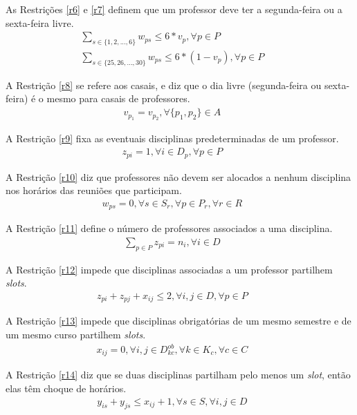 As Restrições \ref{r6} e \ref{r7} definem que um professor deve ter a segunda-feira ou a sexta-feira livre.
\begin{eqnarray}
\label{r6}
\sum_{s\in\{{1, 2, ..., 6}\}}{w_{ps}} \leq 6*v_p, \forall{p \in{P}} &&\\
\label{r7}
\sum_{s\in\{{25, 26, ..., 30}\}}{w_{ps}} \leq 6*(1-v_p), \forall{p \in{P}} &&
\end{eqnarray}

A Restrição \ref{r8} se refere aos casais, e diz que o dia livre (segunda-feira ou sexta-feira) é o mesmo para casais de professores.
\begin{eqnarray}
\label{r8}
v_{p_1} = v_{p_2}, \forall{\{p_1,p_2\} \in{A}} &&
\end{eqnarray}

A Restrição \ref{r9} fixa as eventuais disciplinas predeterminadas de um professor.
\begin{eqnarray}
\label{r9}
z_{pi} = 1, \forall{i \in{D_p}}, \forall{p \in{P}} &&
\end{eqnarray}

A Restrição \ref{r10} diz que professores não devem ser alocados a nenhum disciplina nos horários das reuniões que participam.
\begin{eqnarray}
\label{r10}
w_{ps} = 0, \forall{s \in{S_r}}, \forall{p \in{P_r}}, \forall{r \in{R}} &&
\end{eqnarray}

A Restrição \ref{r11} define o número de professores associados a uma disciplina.
\begin{eqnarray}
\label{r11}
\sum_{p\in{P}}^{}{z_{pi}} = n_i, \forall{i}\in{D} &&
\end{eqnarray}

A Restrição \ref{r12} impede que disciplinas associadas a um professor partilhem \textit{slots}.
\begin{eqnarray}
\label{r12}
z_{pi} + z_{pj} + x_{ij} \leq 2, \forall{i,j}\in{D}, \forall{p}\in{P} &&
\end{eqnarray}

A Restrição \ref{r13} impede que disciplinas obrigatórias de um mesmo semestre e de um mesmo curso partilhem \textit{slots}.
\begin{eqnarray}
\label{r13}
x_{ij} = 0, \forall{i,j}\in{D_{kc}^{ob}}, \forall{k}\in{K_c}, \forall{c}\in{C} &&
\end{eqnarray}

A Restrição \ref{r14} diz que se duas disciplinas partilham pelo menos um \textit{slot}, então elas têm choque de horários.
\begin{eqnarray}
\label{r14}
y_{is} + y_{js} \leq x_{ij} + 1, \forall{s}\in{S}, \forall{i, j}\in{D} &&
\end{eqnarray}


